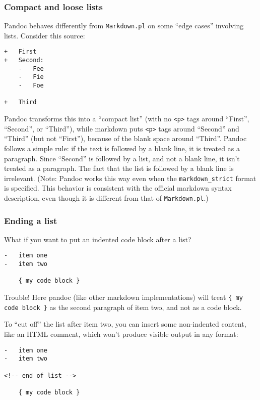 \documentclass[]{article}
\begin{document}
\subsubsection{Compact and loose lists}

Pandoc behaves differently from \texttt{Markdown.pl} on some ``edge
cases'' involving lists. Consider this source:

\begin{verbatim}
+   First
+   Second:
    -   Fee
    -   Fie
    -   Foe

+   Third
\end{verbatim}

Pandoc transforms this into a ``compact list'' (with no
\texttt{\textless{}p\textgreater{}} tags around ``First'', ``Second'',
or ``Third''), while markdown puts \texttt{\textless{}p\textgreater{}}
tags around ``Second'' and ``Third'' (but not ``First''), because of the
blank space around ``Third''. Pandoc follows a simple rule: if the text
is followed by a blank line, it is treated as a paragraph. Since
``Second'' is followed by a list, and not a blank line, it isn't treated
as a paragraph. The fact that the list is followed by a blank line is
irrelevant. (Note: Pandoc works this way even when the
\texttt{markdown\_strict} format is specified. This behavior is
consistent with the official markdown syntax description, even though it
is different from that of \texttt{Markdown.pl}.)

\subsubsection{Ending a list}

What if you want to put an indented code block after a list?

\begin{verbatim}
-   item one
-   item two

    { my code block }
\end{verbatim}

Trouble! Here pandoc (like other markdown implementations) will treat
\texttt{\{ my code block \}} as the second paragraph of item two, and
not as a code block.

To ``cut off'' the list after item two, you can insert some non-indented
content, like an HTML comment, which won't produce visible output in any
format:

\begin{verbatim}
-   item one
-   item two

<!-- end of list -->

    { my code block }
\end{verbatim}
\end{document}
